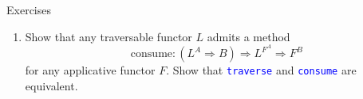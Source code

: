 \documentclass[english]{beamer}
\begin{document}
\begin{frame}{Exercises}
\begin{enumerate}
\item {\footnotesize{}\vspace{-0.15cm}Show that any traversable functor
$L$ admits a method 
\[
\text{consume}:(L^{A}\Rightarrow B)\Rightarrow L^{F^{A}}\Rightarrow F^{B}
\]
for any applicative functor $F$. Show that }\texttt{\textcolor{blue}{\footnotesize{}traverse}}{\footnotesize{}
and }\texttt{\textcolor{blue}{\footnotesize{}consume}}{\footnotesize{}
are equivalent.}{\footnotesize \par}
\end{enumerate}
\end{frame}
\end{document}

